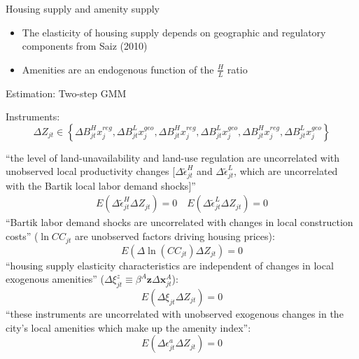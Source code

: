 \documentclass[10pt,notes=hide]{beamer}
\begin{document}
\begin{frame}{Housing supply and amenity supply}
\begin{itemize}
	\item The elasticity of housing supply depends on geographic and regulatory components from Saiz (2010)
	\item Amenities are an endogenous function of the $\frac{H}{L}$ ratio
\end{itemize}
\end{frame}
\begin{frame}[plain]{Estimation: Two-step GMM}

{\small
Instruments:
\begin{equation*}
\Delta Z_{jt} \in \left\{
\Delta B^{H}_{jt} x^{reg}_{j}, 
\Delta B^{L}_{jt} x^{geo}_{j}, 
\Delta B^{H}_{jt} x^{reg}_{j}, 
\Delta B^{L}_{jt} x^{geo}_{j}, 
\Delta B^{H}_{jt} x^{reg}_{j}, 
\Delta B^{L}_{jt} x^{geo}_{j}
\right\}
\end{equation*}

``the level of land-unavailability and land-use regulation are uncorrelated with unobserved local productivity changes [$\Delta \tilde{\epsilon}_{jt}^{H}$ and $\Delta \tilde{\epsilon}_{jt}^{L}$, which are uncorrelated with the Bartik local labor demand shocks]''
\begin{align*}
E \left(\Delta \tilde{\epsilon}_{jt}^{H} \Delta Z_{jt}\right) = 0 
\quad
E \left(\Delta \tilde{\epsilon}_{jt}^{L} \Delta Z_{jt}\right) = 0 
\end{align*}
``Bartik labor demand shocks are uncorrelated with changes in local construction costs'' ($\ln CC_{jt}$ are unobserved factors driving housing prices):
$$
E\left(\Delta \ln(CC_{jt}) \Delta Z_{jt}\right) = 0
$$
``housing supply elasticity characteristics are independent of changes in local exogenous amenities'' ($\Delta \xi^z_{jt} \equiv \beta^A \mathbf{z}\Delta\mathbf{x}_{jt}^{A}$):
$$
E\left(\Delta \xi_{jt} \Delta Z_{jt}\right) = 0
$$
``these instruments are uncorrelated with unobserved exogenous changes
in the city’s local amenities which make up the amenity index'':
$$
E\left(\Delta \epsilon_{jt}^{a} \Delta Z_{jt}\right) = 0
$$
}
\end{frame}
\end{document}
